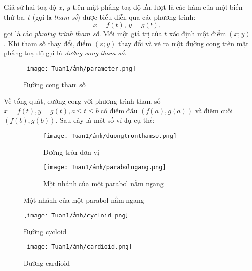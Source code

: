 \begin{definition}
    Giả sử hai toạ độ $x$, $y$ trên mặt phẳng toạ độ lần lượt là các hàm của một biến thứ ba, $t$ (gọi là \emph{tham số}) được biểu diễn qua các phương trình:
     \begin{equation*}   x=f(t),\ y=g(t),
\end{equation*}
    gọi là các \emph{phương trình tham số}. Mỗi một giá trị của $t$ xác định một điểm $(x;y)$. Khi tham số thay đổi, điểm $(x;y)$ thay đổi và vẽ ra một đường cong trên mặt phẳng toạ độ gọi là \emph{đường cong tham số}.
\end{definition}


\vspace{-2 em}
\begin{figure}[h!]
    \centering
    \texttt{[image: Tuan1/ảnh/parameter.png]}
    \caption{Đường cong tham số}
    \label{fig:phuongtrinhthamso}   
\end{figure}    

Về tổng quát, đường cong với phương trình tham số $x=f(t), y=g(t), a\leq t\leq b$ có điểm đầu $(f(a),g(a))$ và điểm cuối $(f(b),g(b))$. \newline Sau đây là một số ví dụ cụ thể:
\begin{figure}
    \centering
    \begin{subfigure}{0.4\textwidth}
        \centering
        \texttt{[image: Tuan1/ảnh/duongtronthamso.png]}
        \caption{Đường tròn đơn vị}
    \end{subfigure}
    \hfill
    \begin{subfigure}{0.5\textwidth}
        \centering
        \texttt{[image: Tuan1/ảnh/parabolngang.png]}
        \caption{Một nhánh của một parabol nằm ngang}
    \end{subfigure}
    \end{figure}
    \vspace{-4em}
    \begin{figure}
        \centering  
        \texttt{[image: Tuan1/ảnh/cycloid.png]}
        \caption{Đường cycloid}
    \end{figure}
    \vspace{-4em}
    \begin{figure}
        \centering
        \texttt{[image: Tuan1/ảnh/cardioid.png]}   
        \caption{Đường cardioid} 
    \end{figure}

